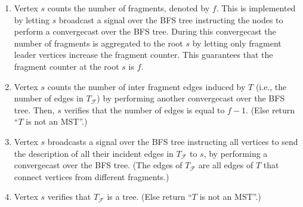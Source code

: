 \documentclass[11pt,letter]{article}
\def\cF{\mathcal{F}}
\begin{document}
\begin{enumerate}
\begin{enumerate}
\item \label{count_fragments}  
Vertex $s$ counts the number of fragments, denoted by $f$. This is implemented by letting $s$ broadcast a signal over the BFS tree instructing the nodes to perform a convergecast 
over the BFS tree. During this convergecast the number of fragments is aggregated to the root $s$ by letting only fragment leader vertices increase 
the fragment counter. This guarantees that the fragment  counter at the root $s$ is $f$.
\item \label{count_inter_fragment}
Vertex $s$ counts the number of inter fragment 
edges induced by $T$ (i.e., the number of edges in $T_{\cF}$) by performing another convergecast over the BFS tree. Then, $s$ verifies that the number of edges is equal to $f -1$. 
(Else return ``$T$ is not an MST''.) 
\item \label{send_Tf}
Vertex $s$ broadcasts a signal over the BFS tree instructing all vertices to send  the description of all their incident edges in $T_{\cF}$ 
to $s$, by performing a convergecast over the BFS tree. (The edges of $T_{\cF}$ are 
all edges of $T$ that connect vertices from different fragments.)
\item \label{verify_tree}Vertex $s$ verifies that $T_{\cF}$ is a tree. 
(Else return ``$T$ is not an MST''.)
\end{enumerate}


\end{enumerate}
\end{document}
